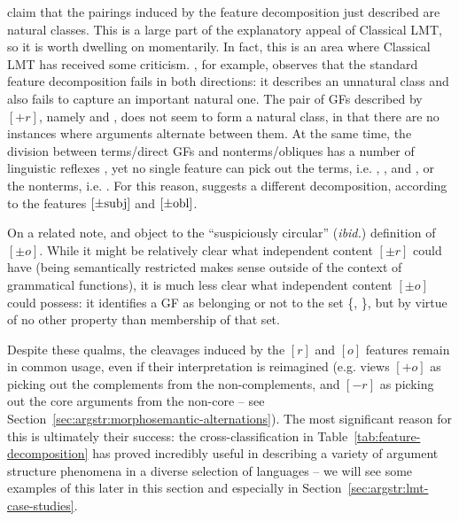 \documentclass[output=paper]{langscibook}
\begin{document}
\citet[25]{bresnan1989locative} claim that the pairings induced by the feature decomposition just described are natural classes. This is a large part of the explanatory appeal of Classical LMT, so it is worth dwelling on momentarily. In fact, this is an area where Classical LMT has received some criticism. \citet{alsina1996the-role}, for example, observes that the standard feature decomposition fails in both directions: it describes an unnatural class and also fails to capture an important natural one. The pair of GFs described by $[+r]$, namely \OBJTHETA and \OBLTHETA, does not seem to form a natural class, in that there are no instances where arguments alternate between them. At the same time, the division between terms\slash direct GFs and nonterms\slash obliques has a number of linguistic reflexes \citep[15--17]{DLM:LFG}, yet no single feature can pick out the terms, i.e. \SUBJ, \OBJ, and \OBJTHETA, or the nonterms, i.e. \OBLTHETA \citep[29, fn.~9]{alsina1996the-role}. For this reason, \citet[19--20]{alsina1996the-role} suggests a different decomposition, according to the features $[\pm\textnormal{subj}]$ and $[\pm
\textnormal{obl}]$.

On a related note, \citet[130]{Findlay2020} and \citet[32]{asudeh:unrealized} object to
the ``suspiciously circular'' (\textit{ibid.}) definition of $[\pm o]$. While it
might be relatively clear what independent content $[\pm r]$ could have (being
semantically restricted makes sense outside of the context of grammatical
functions), it is much less clear what independent content $[\pm o]$ could
possess: it identifies a GF as belonging or not to the set \{\OBJ,
\OBJTHETA{}\}, but by virtue of no other property than membership of that set.

Despite these qualms, the cleavages induced by the $[r]$ and $[o]$ features
remain in common usage, even if their interpretation is reimagined (e.g.
\citealt[266]{kibort14} views $[+o]$ as picking out the complements from the
non-complements, and $[-r]$ as picking out the core arguments from the non-core
-- see Section~\ref{sec:argstr:morphosemantic-alternations}). The most significant
reason for this is ultimately their success: the cross-classification in
Table~\ref{tab:feature-decomposition} has proved incredibly useful in describing
a variety of argument structure phenomena in a diverse selection of languages --
we will see some examples of this later in this section and especially in
Section~\ref{sec:argstr:lmt-case-studies}.
\end{document}
